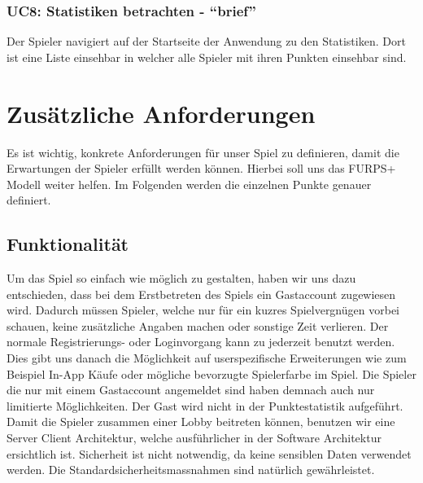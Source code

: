\documentclass[11pt,ngerman]{article}
\newcommand{\quotes}[1]{``#1''}
\begin{document}
             \subsubsection{UC8: Statistiken betrachten - \quotes{brief}}
             \label{sssec:UC8Statistikenbetrachten}
                \begin{tcolorbox}[enhanced, breakable, sharp corners, width=\dimexpr\textwidth-15mm\relax ,enlarge left by=10mm ,fontupper=\linespread{1.1}\selectfont, boxrule=1pt, title={UC8: Statistiken betrachten}, colback=white, colframe=gray!22, coltitle=black]
                    Der Spieler navigiert auf der Startseite der Anwendung zu den Statistiken. Dort ist eine Liste einsehbar in welcher alle Spieler mit ihren Punkten einsehbar sind.
                \end{tcolorbox}

    \section{Zusätzliche Anforderungen}
	Es ist wichtig, konkrete Anforderungen für unser Spiel zu definieren, damit die Erwartungen der Spieler erfüllt werden können. Hierbei soll uns das FURPS+ Modell weiter helfen. Im Folgenden werden die einzelnen Punkte genauer definiert.
    \subsection{Funktionalität}
	Um das Spiel so einfach wie möglich zu gestalten, haben wir uns dazu entschieden, dass bei dem Erstbetreten des Spiels ein Gastaccount zugewiesen wird. Dadurch müssen Spieler, welche nur für ein kuzres Spielvergnügen vorbei schauen, keine zusätzliche Angaben machen oder sonstige Zeit verlieren. Der normale Registrierungs- oder Loginvorgang kann zu jederzeit benutzt werden. Dies gibt uns danach die Möglichkeit auf userspezifische Erweiterungen wie zum Beispiel In-App Käufe oder mögliche bevorzugte Spielerfarbe im Spiel. Die Spieler die nur mit einem Gastaccount angemeldet sind haben demnach auch nur limitierte Möglichkeiten. Der Gast wird nicht in der Punktestatistik aufgeführt.
	Damit die Spieler zusammen einer Lobby beitreten können, benutzen wir eine Server Client Architektur, welche ausführlicher in der Software Architektur ersichtlich ist. Sicherheit ist nicht notwendig, da keine sensiblen Daten verwendet werden. Die Standardsicherheitsmassnahmen sind natürlich gewährleistet.
\end{document}
